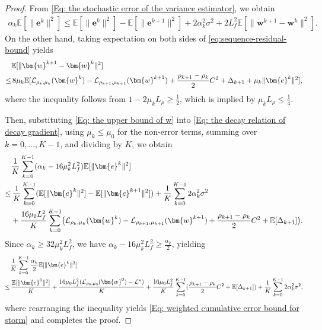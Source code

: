 \documentclass{article}
\theoremstyle{plain}
\theoremstyle{definition}
\theoremstyle{remark}
\newcommand{\EE}{\mathbb{E}}
\newcommand{\be}{\bm{e}}
\newcommand{\calL}{\mathcal{L}}
\newcommand{\bw}{\bm{w}}
\newcommand{\sumK}{\sum_{k=0}^{K-1}}
\numberwithin{equation}{section}
\begin{document}
\begin{proof}
    From \eqref{Eq: the stochastic error of the variance estimator}, we obtain
    \begin{align}
        \label{Eq: the decay relation of decay gradient}\alpha_{k}\EE[\| \be^{k}\|^{2}] \leq \EE[\| \be^{k}\|^{2}] - \EE [ \| \be^{k+1}\|^{2}] + 2 \alpha_{k}^{2}\sigma^{2}+ 2L_f^{2}\EE[ \| \bw^{k+1}- \bw^{k}\|^{2}].
    \end{align}
On the other hand, taking expectation on both sides of \eqref{eq:sequence-residual-bound}
    yields
    \begin{align}
        &\label{Eq: the upper bound of w}\EE [ \| \bw^{k+1}- \bw^{k}\|^{2}]\notag \\
        \leq & \, 8\mu_{k}\EE [ \calL_{\rho_k, \mu_k}(\bw^{k}) - \calL_{\rho_{k+1}, \mu_{k+1}}(\bw^{k+1}) + \frac{\rho_{k+1}- \rho_{k}}{2}C^{2}+ \Delta_{k+1}+ \mu_{k}\|\be^{k}\|^{2}],
    \end{align}
where the inequality follows from
    $1 - 2\mu_{k}L_{\rho}\geq \frac{1}{2}$, which is implied by
    $\mu_{k}L_{\rho}\leq \frac{1}{4}$.

    Then, substituting \eqref{Eq: the upper bound of w} into \eqref{Eq: the decay relation of decay gradient},
    using \(\mu_k\leq \mu_0\) for the non-error terms,
    summing over $k = 0,\ldots, K-1$, and dividing by $K$, we obtain
    \begin{align}
             & \frac{1}{K}\sumK ( \alpha_{k}- 16\mu_{k}^{2}L_f^{2})\EE[\|\be^{k}\|^{2}] \notag\\          
             \leq&\, \frac{1}{K}\sumK ( \EE [\|\be^{k}\|^{2}] - \EE[ \|\be^{k+1}\|^{2}] ) + \frac{1}{K}\sumK 2\alpha^{2}_{k}\sigma^{2} \notag \\
             &+ \frac{16\mu_{0}L_f^{2}}{K}\sumK \bigl( \calL_{\rho_k, \mu_k}(\bw^{k}) - \calL_{\rho_{k+1}, \mu_{k+1}}(\bw^{k+1}) + \frac{\rho_{k+1}- \rho_{k}}{2}C^{2} + \EE[\Delta_{k+1}]\bigl).
    \end{align}
Since $\alpha_{k}\geq 32 \mu_{k}^{2}L_f^{2}$, we have $\alpha_{k}
    - 16\mu_{k}^{2}L_f^{2}\geq \frac{\alpha_{k}}{2}$, yielding
    \begin{align}
            &\frac{1}{K}\sumK \frac{\alpha_{k}}{2}\EE[\|\be^{k}\|^{2}] \notag \\
            \leq&\, \frac{\EE
        [\|\be^{0}\|^{2}]}{K}+ \frac{16\mu_{0}L_f^{2}( \calL_{\rho_0, \mu_0}
        (\bw^{0}) - \calL^{*}) }{K}+ \frac{16\mu_0L_f^2}{K}\sumK ( \frac{\rho_{k+1}-
        \rho_{k}}{2}C^{2} + \EE[\Delta_{k+1}] )+ \frac{1}{K}\sumK 2\alpha^{2}_{k}\sigma^{2}, \notag
    \end{align}
where rearranging the inequality yields \eqref{Eq: weighted cumulative error bound for storm} and completes the proof.
\end{proof}
\end{document}
